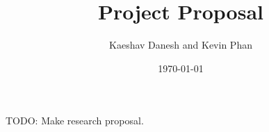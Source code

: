 \documentclass[12pt]{article}
\title{Project Proposal}
\author{Kaeshav Danesh and Kevin Phan}
\date{\today}
\begin{document}
	
	\maketitle
    TODO: Make research proposal. 
\end{document}
